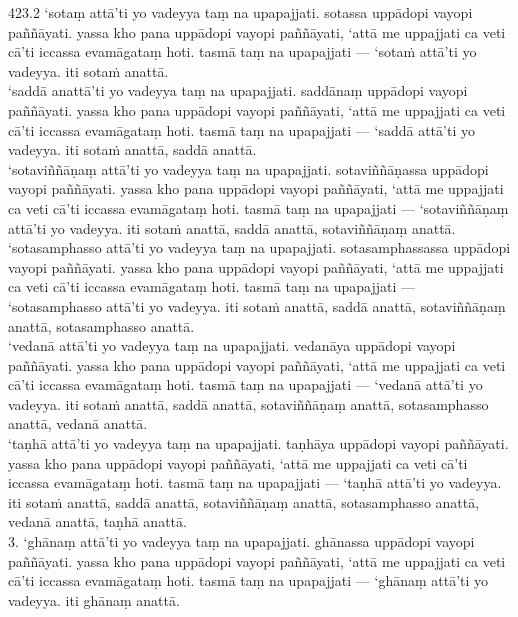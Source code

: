 \documentclass[11pt]{article}
\begin{document}
423.2 ‘sotaṃ attā’ti yo vadeyya taṃ na upapajjati. sotassa uppādopi vayopi paññāyati. yassa kho pana uppādopi vayopi paññāyati, ‘attā me uppajjati ca veti cā’ti iccassa evamāgataṃ hoti. tasmā taṃ na upapajjati — ‘sotaṁ attā’ti yo vadeyya. iti sotaṁ anattā.\\

‘saddā anattā’ti yo vadeyya taṃ na upapajjati. saddānaṃ uppādopi vayopi paññāyati. yassa kho pana uppādopi vayopi paññāyati, ‘attā me uppajjati ca veti cā’ti iccassa evamāgataṃ hoti. tasmā taṃ na upapajjati — ‘saddā attā’ti yo vadeyya. iti sotaṁ anattā, saddā anattā.\\

‘sotaviññāṇaṃ attā’ti yo vadeyya taṃ na upapajjati. sotaviññāṇassa uppādopi vayopi paññāyati. yassa kho pana uppādopi vayopi paññāyati, ‘attā me uppajjati ca veti cā’ti iccassa evamāgataṃ hoti. tasmā taṃ na upapajjati — ‘sotaviññāṇaṃ attā’ti yo vadeyya. iti sotaṁ anattā, saddā anattā, sotaviññāṇaṃ anattā.\\

‘sotasamphasso attā’ti yo vadeyya taṃ na upapajjati. sotasamphassassa uppādopi vayopi paññāyati. yassa kho pana uppādopi vayopi paññāyati, ‘attā me uppajjati ca veti cā’ti iccassa evamāgataṃ hoti. tasmā taṃ na upapajjati — ‘sotasamphasso attā’ti yo vadeyya. iti sotaṁ anattā, saddā anattā, sotaviññāṇaṃ anattā, sotasamphasso anattā.\\

‘vedanā attā’ti yo vadeyya taṃ na upapajjati. vedanāya uppādopi vayopi paññāyati. yassa kho pana uppādopi vayopi paññāyati, ‘attā me uppajjati ca veti cā’ti iccassa evamāgataṃ hoti. tasmā taṃ na upapajjati — ‘vedanā attā’ti yo vadeyya. iti sotaṁ anattā, saddā anattā, sotaviññāṇaṃ anattā, sotasamphasso anattā, vedanā anattā.\\

‘taṇhā attā’ti yo vadeyya taṃ na upapajjati. taṇhāya uppādopi vayopi paññāyati. yassa kho pana uppādopi vayopi paññāyati, ‘attā me uppajjati ca veti cā’ti iccassa evamāgataṃ hoti. tasmā taṃ na upapajjati — ‘taṇhā attā’ti yo vadeyya. iti sotaṁ anattā, saddā anattā, sotaviññāṇaṃ anattā, sotasamphasso anattā, vedanā anattā, taṇhā anattā.\\

3. ‘ghānaṃ attā’ti yo vadeyya taṃ na upapajjati. ghānassa uppādopi vayopi paññāyati. yassa kho pana uppādopi vayopi paññāyati, ‘attā me uppajjati ca veti cā’ti iccassa evamāgataṃ hoti. tasmā taṃ na upapajjati — ‘ghānaṃ attā’ti yo vadeyya. iti ghānaṃ anattā.\\
\end{document}
